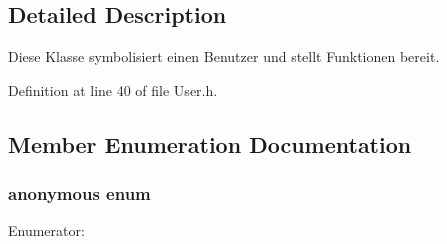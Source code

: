\subsection{Detailed Description}
Diese Klasse symbolisiert einen Benutzer und stellt Funktionen bereit. 

Definition at line 40 of file User.h.

\subsection{Member Enumeration Documentation}
\hypertarget{class_user_6f9db9ebdd86f9c93deff41f7b9193f1}{
\subsubsection["@6]{\setlength{\rightskip}{0pt plus 5cm}anonymous enum}}
\label{class_user_6f9db9ebdd86f9c93deff41f7b9193f1}


\begin{Desc}
\item[Enumerator: ]\par
\begin{description}
\item[{\em 
\hypertarget{class_user_6f9db9ebdd86f9c93deff41f7b9193f11bc1a99427bacb8101d7b99796ce2148}{
superadministrator}
\label{class_user_6f9db9ebdd86f9c93deff41f7b9193f11bc1a99427bacb8101d7b99796ce2148}
}]\item[{\em 
\hypertarget{class_user_6f9db9ebdd86f9c93deff41f7b9193f155b52804af3433a9d28257d0a0a54eb3}{
administrator}
\label{class_user_6f9db9ebdd86f9c93deff41f7b9193f155b52804af3433a9d28257d0a0a54eb3}
}]\item[{\em 
\hypertarget{class_user_6f9db9ebdd86f9c93deff41f7b9193f11813ae9ec397f1858dda882399516656}{
manager}
\label{class_user_6f9db9ebdd86f9c93deff41f7b9193f11813ae9ec397f1858dda882399516656}
}]\item[{\em 
\hypertarget{class_user_6f9db9ebdd86f9c93deff41f7b9193f1d7f13ff6c9b4738cc12563330ef164e9}{
user}
\label{class_user_6f9db9ebdd86f9c93deff41f7b9193f1d7f13ff6c9b4738cc12563330ef164e9}
}]\end{description}
\end{Desc}



